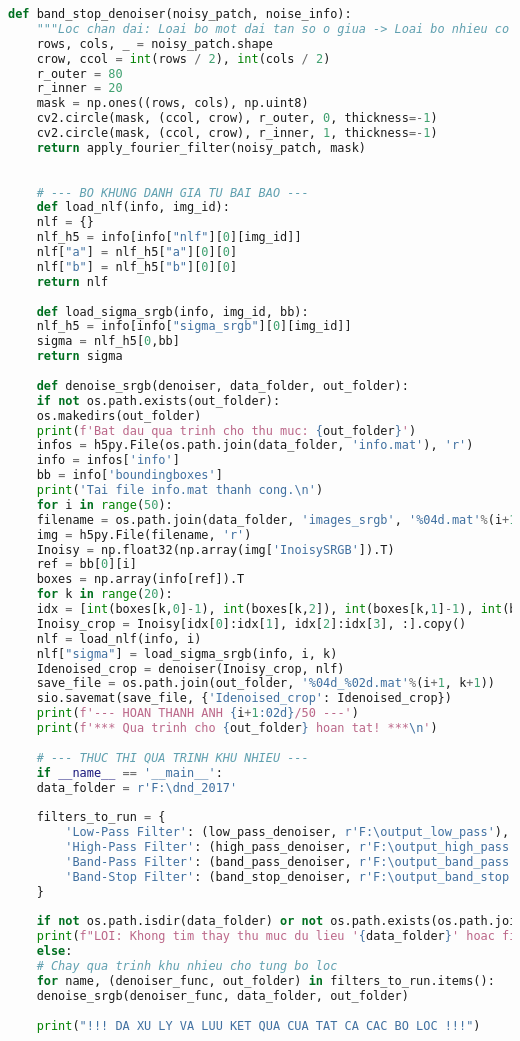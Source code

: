 \documentclass[12pt, a4paper]{article}
\begin{document}
\begin{lstlisting}[language=Python, caption={Mã nguồn xử lý và khử nhiễu ảnh.}, label={lst:run_denoising}]
	def band_stop_denoiser(noisy_patch, noise_info):
	"""Loc chan dai: Loai bo mot dai tan so o giua -> Loai bo nhieu co quy luat."""
	rows, cols, _ = noisy_patch.shape
	crow, ccol = int(rows / 2), int(cols / 2)
	r_outer = 80
	r_inner = 20
	mask = np.ones((rows, cols), np.uint8)
	cv2.circle(mask, (ccol, crow), r_outer, 0, thickness=-1)
	cv2.circle(mask, (ccol, crow), r_inner, 1, thickness=-1)
	return apply_fourier_filter(noisy_patch, mask)
	
	
	# --- BO KHUNG DANH GIA TU BAI BAO ---
	def load_nlf(info, img_id):
	nlf = {}
	nlf_h5 = info[info["nlf"][0][img_id]]
	nlf["a"] = nlf_h5["a"][0][0]
	nlf["b"] = nlf_h5["b"][0][0]
	return nlf
	
	def load_sigma_srgb(info, img_id, bb):
	nlf_h5 = info[info["sigma_srgb"][0][img_id]]
	sigma = nlf_h5[0,bb]
	return sigma
	
	def denoise_srgb(denoiser, data_folder, out_folder):
	if not os.path.exists(out_folder):
	os.makedirs(out_folder)
	print(f'Bat dau qua trinh cho thu muc: {out_folder}')
	infos = h5py.File(os.path.join(data_folder, 'info.mat'), 'r')
	info = infos['info']
	bb = info['boundingboxes']
	print('Tai file info.mat thanh cong.\n')
	for i in range(50):
	filename = os.path.join(data_folder, 'images_srgb', '%04d.mat'%(i+1))
	img = h5py.File(filename, 'r')
	Inoisy = np.float32(np.array(img['InoisySRGB']).T)
	ref = bb[0][i]
	boxes = np.array(info[ref]).T
	for k in range(20):
	idx = [int(boxes[k,0]-1), int(boxes[k,2]), int(boxes[k,1]-1), int(boxes[k,3])]
	Inoisy_crop = Inoisy[idx[0]:idx[1], idx[2]:idx[3], :].copy()
	nlf = load_nlf(info, i)
	nlf["sigma"] = load_sigma_srgb(info, i, k)
	Idenoised_crop = denoiser(Inoisy_crop, nlf)
	save_file = os.path.join(out_folder, '%04d_%02d.mat'%(i+1, k+1))
	sio.savemat(save_file, {'Idenoised_crop': Idenoised_crop})
	print(f'--- HOAN THANH ANH {i+1:02d}/50 ---')
	print(f'*** Qua trinh cho {out_folder} hoan tat! ***\n')
	
	# --- THUC THI QUA TRINH KHU NHIEU ---
	if __name__ == '__main__':
	data_folder = r'F:\dnd_2017' 
	
	filters_to_run = {
		'Low-Pass Filter': (low_pass_denoiser, r'F:\output_low_pass'),
		'High-Pass Filter': (high_pass_denoiser, r'F:\output_high_pass'),
		'Band-Pass Filter': (band_pass_denoiser, r'F:\output_band_pass'),
		'Band-Stop Filter': (band_stop_denoiser, r'F:\output_band_stop')
	}
	
	if not os.path.isdir(data_folder) or not os.path.exists(os.path.join(data_folder, 'info.mat')):
	print(f"LOI: Khong tim thay thu muc du lieu '{data_folder}' hoac file 'info.mat' ben trong.")
	else:
	# Chay qua trinh khu nhieu cho tung bo loc
	for name, (denoiser_func, out_folder) in filters_to_run.items():
	denoise_srgb(denoiser_func, data_folder, out_folder)
	
	print("!!! DA XU LY VA LUU KET QUA CUA TAT CA CAC BO LOC !!!")
\end{lstlisting}
\end{document}
